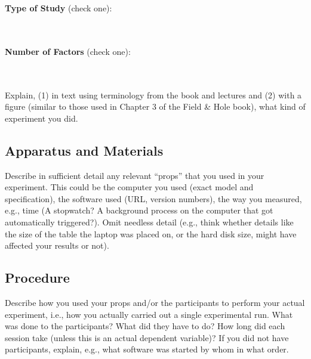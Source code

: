 \documentclass{article}
\begin{document}
\textbf{Type of Study} (check one):\\
\noindent
\begin{minipage}{0.4\textwidth}
\end{minipage}%
\begin{minipage}{0.4\textwidth}
\end{minipage}%
\begin{minipage}{0.0\textwidth}
\end{minipage}
\\\\
\textbf{Number of Factors} (check one):\\
\noindent
\begin{minipage}{0.4\textwidth}
\end{minipage}%
\begin{minipage}{0.4\textwidth}
\end{minipage}%
\begin{minipage}{0.0\textwidth}
\end{minipage}
\\\\
Explain, (1) in text using terminology from the book and lectures and (2) with a figure (similar to those used in Chapter 3 of the Field \& Hole book), what kind of experiment you did.

\subsection{Apparatus and Materials}
Describe in sufficient detail any relevant “props” that you used in your experiment. This could be the computer you used (exact model and specification), the software used (URL, version numbers), the way you measured, e.g., time (A stopwatch? A background process on the computer that got automatically triggered?). Omit needless detail (e.g., think whether details like the size of the table the laptop was placed on, or the hard disk size, might have affected your results or not).

\subsection{Procedure}
Describe how you used your props and/or the participants to perform your actual experiment, i.e., how you actually carried out a single experimental run. What was done to the participants? What did they have to do? How long did each session take (unless this is an actual dependent variable)? If you did not have participants, explain, e.g., what software was started by whom in what order.
\end{document}
